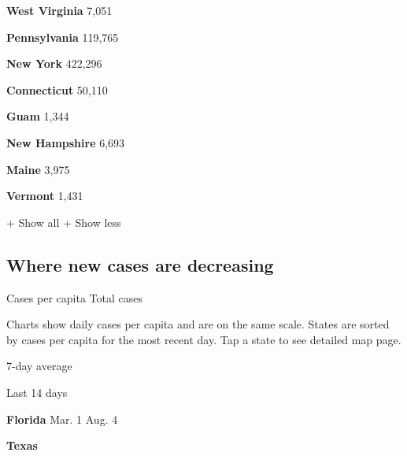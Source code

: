 \textbf{West Virginia} 7,051

\href{https://www.nytimes3xbfgragh.onion/interactive/2020/us/pennsylvania-coronavirus-cases.html}{}

\textbf{Pennsylvania} 119,765

\href{https://www.nytimes3xbfgragh.onion/interactive/2020/us/new-york-coronavirus-cases.html}{}

\textbf{New York} 422,296

\href{https://www.nytimes3xbfgragh.onion/interactive/2020/us/connecticut-coronavirus-cases.html}{}

\textbf{Connecticut} 50,110

\textbf{Guam} 1,344

\href{https://www.nytimes3xbfgragh.onion/interactive/2020/us/new-hampshire-coronavirus-cases.html}{}

\textbf{New Hampshire} 6,693

\href{https://www.nytimes3xbfgragh.onion/interactive/2020/us/maine-coronavirus-cases.html}{}

\textbf{Maine} 3,975

\href{https://www.nytimes3xbfgragh.onion/interactive/2020/us/vermont-coronavirus-cases.html}{}

\textbf{Vermont} 1,431

+ Show all + Show less

\hypertarget{where-new-cases-are-decreasing}{%
\subsection{Where new cases are
decreasing}\label{where-new-cases-are-decreasing}}

Cases per capita Total cases

Charts show daily cases per capita and are on the same scale. States are
sorted by cases per capita for the most recent day. Tap a state to see
detailed map page.

\href{https://www.nytimes3xbfgragh.onion/interactive/2020/us/florida-coronavirus-cases.html}{}

7-day average

Last 14 days

\textbf{Florida} Mar. 1 Aug. 4

\href{https://www.nytimes3xbfgragh.onion/interactive/2020/us/texas-coronavirus-cases.html}{}

\textbf{Texas}

\href{https://www.nytimes3xbfgragh.onion/interactive/2020/us/arizona-coronavirus-cases.html}{}

